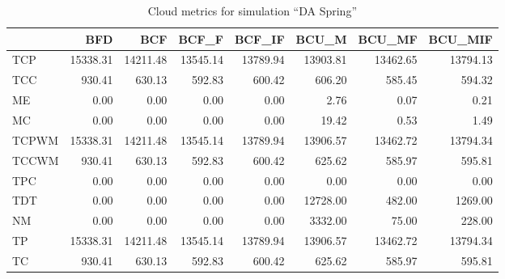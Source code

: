 \begin{table}[ht]
\centering
\vspace*{-0.4in}
\begin{tabular}{lrrrrrrr}
\toprule
{} &       BFD &       BCF &     BCF\_F &    BCF\_IF &     BCU\_M &    BCU\_MF &   BCU\_MIF \\
\midrule
TCP   &  15338.31 &  14211.48 &  13545.14 &  13789.94 &  13903.81 &  13462.65 &  13794.13 \\
TCC   &    930.41 &    630.13 &    592.83 &    600.42 &    606.20 &    585.45 &    594.32 \\
ME    &      0.00 &      0.00 &      0.00 &      0.00 &      2.76 &      0.07 &      0.21 \\
MC    &      0.00 &      0.00 &      0.00 &      0.00 &     19.42 &      0.53 &      1.49 \\
TCPWM &  15338.31 &  14211.48 &  13545.14 &  13789.94 &  13906.57 &  13462.72 &  13794.34 \\
TCCWM &    930.41 &    630.13 &    592.83 &    600.42 &    625.62 &    585.97 &    595.81 \\
TPC   &      0.00 &      0.00 &      0.00 &      0.00 &      0.00 &      0.00 &      0.00 \\
TDT   &      0.00 &      0.00 &      0.00 &      0.00 &  12728.00 &    482.00 &   1269.00 \\
NM    &      0.00 &      0.00 &      0.00 &      0.00 &   3332.00 &     75.00 &    228.00 \\
TP    &  15338.31 &  14211.48 &  13545.14 &  13789.94 &  13906.57 &  13462.72 &  13794.34 \\
TC    &    930.41 &    630.13 &    592.83 &    600.42 &    625.62 &    585.97 &    595.81 \\
\bottomrule
\end{tabular}
\caption{Cloud metrics for simulation "`DA Spring"'}
\end{table}


